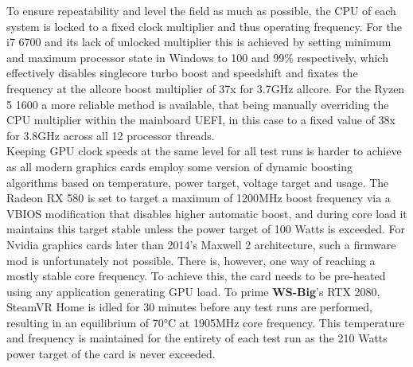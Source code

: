 To ensure repeatability and level the field as much as possible, the CPU of each system is locked to a fixed clock multiplier and thus operating frequency. For the i7 6700 and its lack of unlocked multiplier this is achieved by setting minimum and maximum processor state in Windows to 100 and 99\% respectively, which effectively disables singlecore turbo boost and speedshift and fixates the frequency at the allcore boost multiplier of 37x for 3.7GHz allcore. For the Ryzen 5 1600 a more reliable method is available, that being manually overriding the CPU multiplier within the mainboard UEFI, in this case to a fixed value of 38x for 3.8GHz across all 12 processor threads. \\
Keeping GPU clock speeds at the same level for all test runs is harder to achieve as all modern graphics cards employ some version of dynamic boosting algorithms based on temperature, power target, voltage target and usage. The Radeon RX 580 is set to target a maximum of 1200MHz boost frequency via a VBIOS modification that disables higher automatic boost, and during core load it maintains this target stable unless the power target of 100 Watts is exceeded. 
For Nvidia graphics cards later than 2014's Maxwell 2 architecture, such a firmware mod is unfortunately not possible. There is, however, one way of reaching a mostly stable core frequency. To achieve this, the card needs to be pre-heated using any application generating GPU load. To prime \textbf{WS-Big}'s RTX 2080, SteamVR Home is idled for 30 minutes before any test runs are performed, resulting in an equilibrium of \ang{70}C at 1905MHz core frequency. This temperature and frequency is maintained for the entirety of each test run as the 210 Watts power target of the card is never exceeded. 